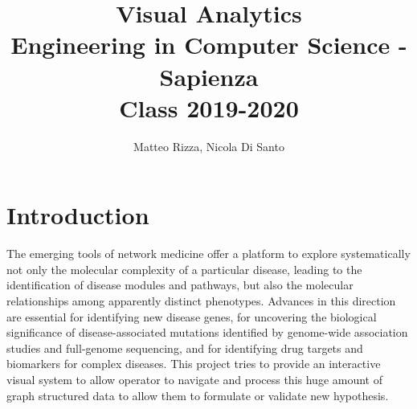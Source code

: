 \documentclass[12pt,twocolumn,twoside]{article}
\begin{document}
	
	\title{Visual Analytics \\
		\large Engineering in Computer Science - Sapienza\\ Class 2019-2020}
	
	
	\author{Matteo Rizza, Nicola Di Santo}

 
\clearpage
\section*{Introduction}
The emerging tools of network medicine offer a platform to explore systematically not only the molecular complexity of a particular disease, leading to the identification of disease modules and pathways, but also the molecular relationships among apparently distinct phenotypes. Advances in this direction are essential for identifying new disease genes, for uncovering the biological significance of disease-associated mutations identified by genome-wide association studies and full-genome sequencing, and for identifying drug targets and biomarkers for complex diseases. This project tries to provide an interactive visual system to allow operator to navigate and process this huge amount of graph structured data to allow them to formulate or validate new hypothesis.\\ %
\end{document}

